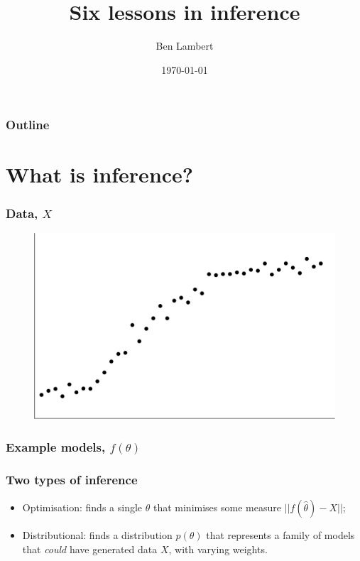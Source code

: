 \documentclass[handout]{beamer}
\title{Six lessons in inference}
\author[Ben]{Ben Lambert}
\date{\today}
\begin{document}
\begin{frame}
\titlepage
\end{frame}

\begin{frame}
	\frametitle{Outline}
	\tableofcontents
\end{frame}

\section{What is inference?}

\frame{\tableofcontents[currentsection]}

\begin{frame}
	\frametitle{Data, $X$}
	
	\begin{figure}[ht]
		\includegraphics[width=1\textwidth]{./Animations/inference_data.png}
	\end{figure}
	
\end{frame}


\begin{frame}
	\frametitle{Example models, $f(\theta)$}
	
	\begin{figure}[t]
		\centerline{}
	\end{figure}
\end{frame}

\begin{frame}
	\frametitle{Two types of inference}
	
	\begin{itemize}
		\item Optimisation: finds a single $\hat{\theta}$ that minimises some measure $||f(\hat{\theta})-X||$; 
		\item Distributional: finds a distribution $p(\theta)$ that represents a family of models that \textit{could} have generated data $X$, with varying weights.
	\end{itemize}
	
\end{frame}
\end{document}
